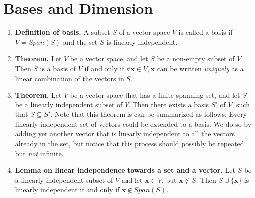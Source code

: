 \documentclass[oneside, 12pt]{book}
\newcommand{\settag}[1]{\renewcommand{\theenumi}{#1}}
\newcommand{\tbf}[1]{\textbf{#1}}
\newcommand{\tit}[1]{\textit{#1}}
\begin{document}
\section{Bases and Dimension}
    \begin{enumerate}
        \settag{1.6.1}
        \item \tbf{Definition of basis.} A subset $S$ of a vector space $V$ is called a basis if $V=Span(S)$ and the set $S$ is linearly independent.
        
        \settag{1.6.3}
        \item \tbf{Theorem. }Let $V$ be a vector space, and let $S$ be a non-empty subset of $V$. Then $S$ is a basis of $V$ if and only if $\forall \mathbf{x} \in V, \mathbf{x}$ can be written \tit{uniquely} as a linear combination of the vectors in $S$.
        
        \settag{1.6.6}
        \item \tbf{Theorem. }Let $V$ be a vector space that has a finite spanning set, and let $S$ be a linearly independent subset of $V$. Then there exists a basis $S'$ of $V$, such that $S\subseteq S'.$ Note that this theorem is can be summarized as follows: Every linearly independent set of vectors could be extended to a basis. We do so by adding yet another vector that is linearly independent to all the vectors already in the set, but notice that this process should possibly be repeated but \tit{not} infinite.
        
        \settag{1.6.8}
        \item \tbf{Lemma on linear independence towards a set and a vector.} Let $S$ be a linearly independent subset of $V$ and let $\mathbf{x}\in V$, but $\mathbf{x} \notin S$. Then $S\cup \{\mathbf{x} \}$ is linearly independent if and only if $\mathbf{x} \notin Span(S)$.
        

\end{enumerate}
\end{document}
